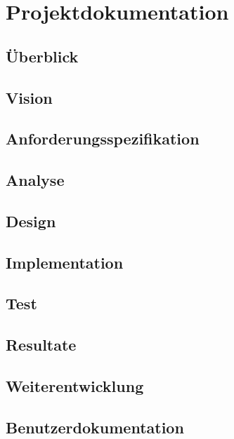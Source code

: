 \chapter{Projektdokumentation}

\section{Überblick}

\section{Vision}

\section{Anforderungsspezifikation}

\section{Analyse}

\section{Design}

\section{Implementation}

\section{Test}

\section{Resultate}

\section{Weiterentwicklung}

\section{Benutzerdokumentation}
